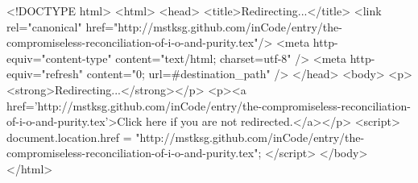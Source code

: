 <!DOCTYPE html>
<html>
<head>
<title>Redirecting...</title>
<link rel="canonical" href="http://mstksg.github.com/inCode/entry/the-compromiseless-reconciliation-of-i-o-and-purity.tex"/>
<meta http-equiv="content-type" content="text/html; charset=utf-8" />
<meta http-equiv="refresh" content="0; url=#{destination_path}" />
</head>
<body>
  <p><strong>Redirecting...</strong></p>
  <p><a href='http://mstksg.github.com/inCode/entry/the-compromiseless-reconciliation-of-i-o-and-purity.tex'>Click here if you are not redirected.</a></p>
  <script>
    document.location.href = "http://mstksg.github.com/inCode/entry/the-compromiseless-reconciliation-of-i-o-and-purity.tex";
  </script>
</body>
</html>
